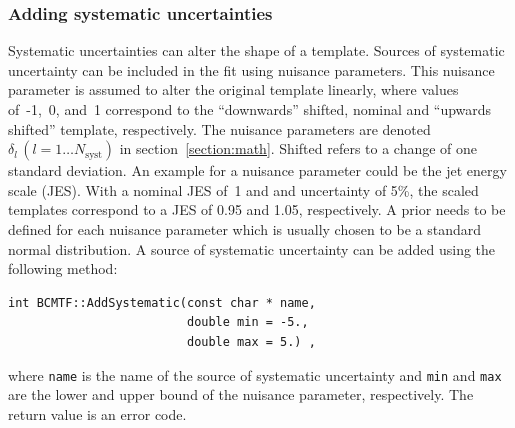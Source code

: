 \documentclass[11pt, a4paper]{article}
\begin{document}
\subsubsection{Adding systematic uncertainties}

Systematic uncertainties can alter the shape of a template. Sources of
systematic uncertainty can be included in the fit using nuisance
parameters. This nuisance parameter is assumed to alter the original
template linearly, where values of~-1,~0, and~1 correspond to the
``downwards'' shifted, nominal and ``upwards shifted'' template,
respectively. The nuisance parameters are denoted $\delta_{l} \,
(l=1\dots N_{\mathrm{syst}})$ in section~\ref{section:math}. Shifted
refers to a change of one standard deviation. An example for a
nuisance parameter could be the jet energy scale (JES). With a nominal
JES of~1 and and uncertainty of 5\%, the scaled templates correspond
to a JES of 0.95 and 1.05, respectively. A prior needs to be defined
for each nuisance parameter which is usually chosen to be a standard
normal distribution. A source of systematic uncertainty can be added
using the following method:
%
\begin{verbatim}
int BCMTF::AddSystematic(const char * name,
                         double min = -5.,
                         double max = 5.) ,
\end{verbatim}
%
where \verb|name| is the name of the source of systematic uncertainty
and \verb|min| and \verb|max| are the lower and upper bound of the
nuisance parameter, respectively. The return value is an error code.
\end{document}
